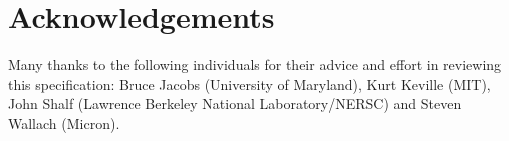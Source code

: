 \documentclass{article}
\begin{document}
\newpage
\section*{Acknowledgements}
\label{Acknowledgements}

Many thanks to the following individuals for their advice and 
effort in reviewing this specification: Bruce Jacobs (University 
of Maryland), Kurt Keville (MIT), John Shalf (Lawrence Berkeley 
National Laboratory/NERSC) and Steven Wallach (Micron).  

\newpage
{}



\newpage

\glsaddall
{}
\printglossary[title=List of Terms,toctitle=List of Terms]
\end{document}
